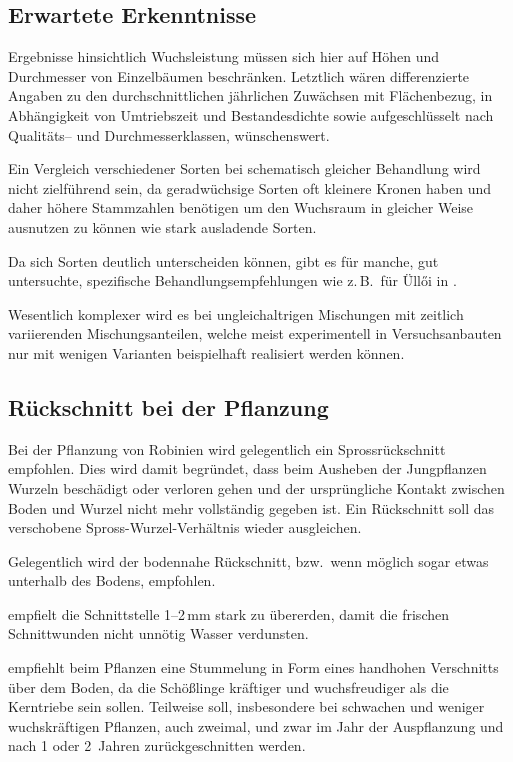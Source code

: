 \documentclass[twocolumn]{scrartcl}
\begin{document}
\subsection{Erwartete Erkenntnisse}

Ergebnisse hinsichtlich Wuchsleistung müssen sich hier auf Höhen und
Durchmesser von Einzelbäumen beschränken. Letztlich wären
differenzierte Angaben zu den durchschnittlichen jährlichen Zuwächsen
mit Flächenbezug, in Abhängigkeit von Umtriebszeit und Bestandesdichte
sowie aufgeschlüsselt nach Qualitäts-- und Durchmesserklassen,
wünschenswert.

Ein Vergleich verschiedener Sorten bei schematisch gleicher Behandlung
wird nicht zielführend sein, da geradwüchsige Sorten oft kleinere
Kronen haben \citep{bujtas1984robinie} und daher höhere Stammzahlen
benötigen \citep{keresztesi1974robinie} um den Wuchsraum in gleicher
Weise ausnutzen zu können wie stark ausladende Sorten.

Da sich Sorten deutlich unterscheiden können, gibt es für manche, gut
untersuchte, spezifische Behandlungsempfehlungen wie z.\,B.\ für Üllői
in \citet{redei2020ulloi}.

Wesentlich komplexer wird es bei ungleichaltrigen Mischungen mit
zeitlich variierenden Mischungsanteilen, welche meist experimentell in
Versuchsanbauten nur mit wenigen Varianten beispielhaft realisiert
werden können.

\subsection{Rückschnitt bei der Pflanzung}

Bei der Pflanzung von Robinien wird gelegentlich ein Sprossrückschnitt
empfohlen. Dies wird damit begründet, dass beim Ausheben der
Jungpflanzen Wurzeln beschädigt oder verloren gehen und der
ursprüngliche Kontakt zwischen Boden und Wurzel nicht mehr vollständig
gegeben ist. Ein Rückschnitt soll das verschobene
Spross-Wurzel-Verhältnis wieder ausgleichen.

Gelegentlich wird der bodennahe Rückschnitt, bzw.\ wenn möglich sogar
etwas unterhalb des Bodens, empfohlen.

\citet{bier1958robinie} empfielt die Schnittstelle 1--2\,mm stark zu
übererden, damit die frischen Schnittwunden nicht unnötig Wasser
verdunsten.

\citet[S.~78]{erteld1952robinieErtrag} empfiehlt beim Pflanzen eine
Stummelung in Form eines handhohen Verschnitts über dem Boden, da die
Schößlinge kräftiger und wuchsfreudiger als die Kerntriebe sein
sollen. Teilweise soll, insbesondere bei schwachen und weniger
wuchskräftigen Pflanzen, auch zweimal, und zwar im Jahr der
Auspflanzung und nach 1 oder 2~Jahren zurückgeschnitten werden.
\end{document}

